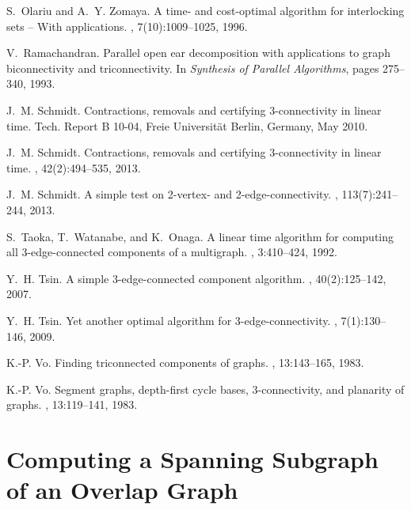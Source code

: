 \documentclass[paper=a4]{scrartcl}
\begin{document}
\begin{thebibliography}{10}
S.~Olariu and A.~Y. Zomaya.
\newblock A time- and cost-optimal algorithm for interlocking sets -- {W}ith
  applications.
, 7(10):1009--1025, 1996.

V.~Ramachandran.
\newblock Parallel open ear decomposition with applications to graph
  biconnectivity and triconnectivity.
\newblock In {\em Synthesis of Parallel Algorithms}, pages 275--340, 1993.

J.~M. Schmidt.
\newblock Contractions, removals and certifying 3-connectivity in linear time.
\newblock Tech. Report B 10-04, Freie Universit\"at Berlin, Germany, May 2010.

J.~M. Schmidt.
\newblock Contractions, removals and certifying 3-connectivity in linear time.
, 42(2):494--535, 2013.

J.~M. Schmidt.
\newblock A simple test on 2-vertex- and 2-edge-connectivity.
, 113(7):241--244, 2013.

S.~Taoka, T.~Watanabe, and K.~Onaga.
\newblock A linear time algorithm for computing all 3-edge-connected components
  of a multigraph.
, 3:410--424, 1992.

Y.~H. Tsin.
\newblock A simple 3-edge-connected component algorithm.
, 40(2):125--142, 2007.

Y.~H. Tsin.
\newblock Yet another optimal algorithm for 3-edge-connectivity.
, 7(1):130--146, 2009.

K.-P. Vo.
\newblock Finding triconnected components of graphs.
, 13:143--165, 1983.

K.-P. Vo.
\newblock Segment graphs, depth-first cycle bases, 3-connectivity, and
  planarity of graphs.
, 13:119--141, 1983.

\end{thebibliography}



\appendix

\section{Computing a Spanning Subgraph of an Overlap Graph}
\end{document}
